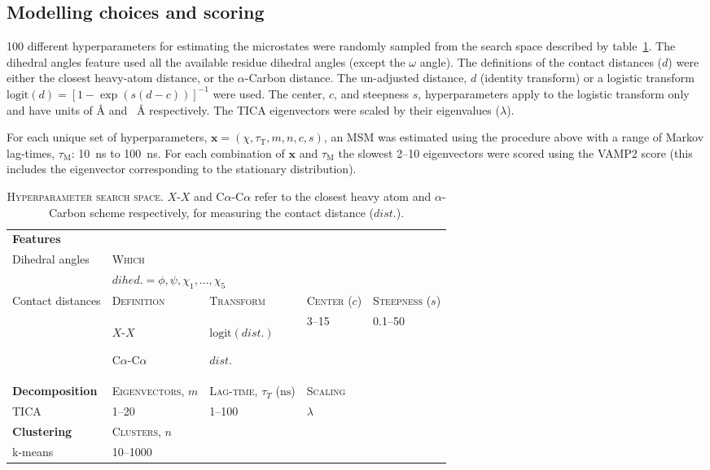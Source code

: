 \documentclass[journal=jacsat,manuscript=article]{achemso}
\newcommand{\nextitem}{\par\hspace*{\labelsep}\textbullet\hspace*{\labelsep}}
\begin{document}
\subsection{Modelling choices and scoring}
\num{100} different hyperparameters for estimating the microstates were randomly sampled from the search space described by table~\ref{tab:search_space}. The dihedral angles feature used all the available residue dihedral angles (except the $\omega$ angle). The definitions of the contact distances ($d$) were either the closest heavy-atom distance, or the $\alpha$-Carbon distance. The un-adjusted distance, $d$ (identity transform) or a  logistic transform $\mathrm{logit}(d) = [1-\exp{(s(d-c))}]^{-1}$ were used. The center, $c$, and steepness $s$, hyperparameters apply to the logistic transform only and have units of \si{\angstrom} and \si{\per\angstrom} respectively. The TICA eigenvectors were scaled by their eigenvalues ($\lambda$).

For each unique set of hyperparameters, $\mathbf{x} = (\chi, \tau_{\mathrm{T}}, m, n, c, s)$,  an MSM was estimated using the procedure above with a range of Markov lag-times, $\tau_{\mathrm{M}}$: \SI{10}{\nano\second} to \SI{100}{\nano\second}. For each combination of $\mathbf{x}$ and  $\tau_{\mathrm{M}}$ the slowest \numrange{2}{10} eigenvectors were scored using the VAMP2 score (this includes the eigenvector corresponding to the stationary distribution). 
\begin{table}
    \centering
    \begin{tabularx}{\textwidth}{lXXXX}
    \toprule
    \textbf{Features}  & & & &\\
    Dihedral angles & \textsc{Which} & & &\\
    & \multicolumn{2}{l}{$dihed.=\phi, \psi, \chi_{1}, \ldots, \chi_{5}$ } & & \\
    Contact distances &  \textsc{Definition} & \textsc{Transform}& \textsc{Center} ($c$) & \textsc{Steepness} ($s$) \\

     & \nextitem $X$-$X$  \nextitem C$\alpha$-C$\alpha$ & \nextitem $\mathrm{logit}(dist.)$ \nextitem $dist.$ &  \numrange{3}{15} & \numrange{0.1}{50} \\
    \midrule
    \textbf{Decomposition} & \textsc{Eigenvectors}, $m$ & \textsc{Lag-time}, $\tau_{T}$ ($\si{\nano\second}$) & \textsc{Scaling}\\ 
    TICA & \numrange{1}{20} & \numrange{1}{100} & $\lambda$\\
    \midrule
    \textbf{Clustering} & \textsc{Clusters}, $n$ &\\
    k-means & \numrange{10}{1000} & \\
    \bottomrule
    \end{tabularx}
    \caption{\textsc{Hyperparameter search space}. $X$-$X$ and C$\alpha$-C$\alpha$  refer to the closest heavy atom and $\alpha$-Carbon scheme respectively, for measuring the contact distance ($dist.$).  }
    \label{tab:search_space}
\end{table}
\end{document}

